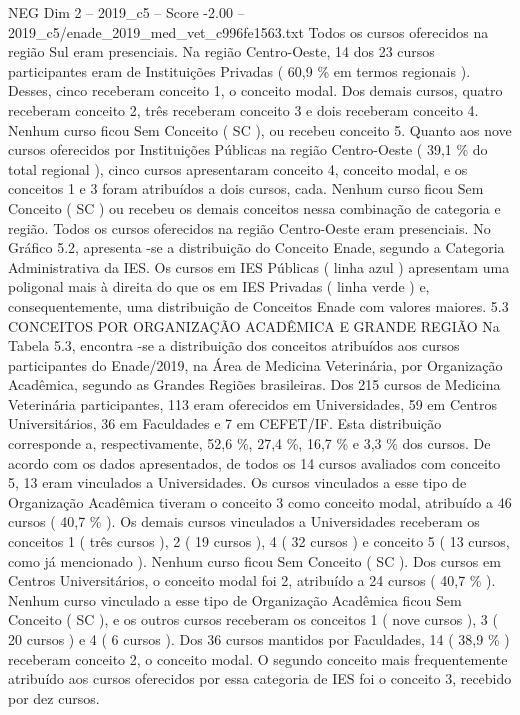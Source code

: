 \begin{textsample}{NEG Dim 2 – 2019\_c5 – Score -2.00 – 2019\_c5/enade\_2019\_med\_vet\_c996fe1563.txt}
Todos os cursos oferecidos na região Sul eram presenciais.
Na região Centro-Oeste, 14 dos 23 cursos participantes eram de Instituições Privadas ( 60,9 \% em termos regionais ).
Desses, cinco receberam conceito 1, o conceito modal.
Dos demais cursos, quatro receberam conceito 2, três receberam conceito 3 e dois receberam conceito 4.
Nenhum curso ficou Sem Conceito ( SC ), ou recebeu conceito 5.
Quanto aos nove cursos oferecidos por Instituições Públicas na região Centro-Oeste ( 39,1 \% do total regional ), cinco cursos apresentaram conceito 4, conceito modal, e os conceitos 1 e 3 foram atribuídos a dois cursos, cada.
Nenhum curso ficou Sem Conceito ( SC ) ou recebeu os demais conceitos nessa combinação de categoria e região.
Todos os cursos oferecidos na região Centro-Oeste eram presenciais.
No Gráfico 5.2, apresenta -se a distribuição do Conceito Enade, segundo a Categoria Administrativa da IES.
Os cursos em IES Públicas ( linha azul ) apresentam uma poligonal mais à direita do que os em IES Privadas ( linha verde ) e, consequentemente, uma distribuição de Conceitos Enade com valores maiores. 5.3 CONCEITOS POR ORGANIZAÇÃO ACADÊMICA E GRANDE REGIÃO Na Tabela 5.3, encontra -se a distribuição dos conceitos atribuídos aos cursos participantes do Enade/2019, na Área de Medicina Veterinária, por Organização Acadêmica, segundo as Grandes Regiões brasileiras.
Dos 215 cursos de Medicina Veterinária participantes, 113 eram oferecidos em Universidades, 59 em Centros Universitários, 36 em Faculdades e 7 em CEFET/IF.
Esta distribuição corresponde a, respectivamente, 52,6 \%, 27,4 \%, 16,7 \% e 3,3 \% dos cursos.
De acordo com os dados apresentados, de todos os 14 cursos avaliados com conceito 5, 13 eram vinculados a Universidades.
Os cursos vinculados a esse tipo de Organização Acadêmica tiveram o conceito 3 como conceito modal, atribuído a 46 cursos ( 40,7 \% ).
Os demais cursos vinculados a Universidades receberam os conceitos 1 ( três cursos ), 2 ( 19 cursos ), 4 ( 32 cursos ) e conceito 5 ( 13 cursos, como já mencionado ).
Nenhum curso ficou Sem Conceito ( SC ).
Dos cursos em Centros Universitários, o conceito modal foi 2, atribuído a 24 cursos ( 40,7 \% ).
Nenhum curso vinculado a esse tipo de Organização Acadêmica ficou Sem Conceito ( SC ), e os outros cursos receberam os conceitos 1 ( nove cursos ), 3 ( 20 cursos ) e 4 ( 6 cursos ).
Dos 36 cursos mantidos por Faculdades, 14 ( 38,9 \% ) receberam conceito 2, o conceito modal.
O segundo conceito mais frequentemente atribuído aos cursos oferecidos por essa categoria de IES foi o conceito 3, recebido por dez cursos.

\end{textsample}
